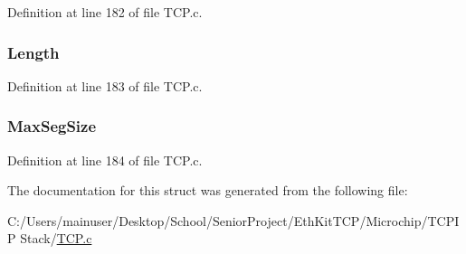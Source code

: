 Definition at line 182 of file T\+C\+P.\+c.

\hypertarget{struct_t_c_p___o_p_t_i_o_n_s_ae875c7698e130ba8324b8746c3ef7a11}{}
\subsubsection[{Length}]{ Length}\label{struct_t_c_p___o_p_t_i_o_n_s_ae875c7698e130ba8324b8746c3ef7a11}


Definition at line 183 of file T\+C\+P.\+c.

\hypertarget{struct_t_c_p___o_p_t_i_o_n_s_a4414eab3a6c9ce2fa592d8917a143515}{}
\subsubsection[{Max\+Seg\+Size}]{ Max\+Seg\+Size}\label{struct_t_c_p___o_p_t_i_o_n_s_a4414eab3a6c9ce2fa592d8917a143515}


Definition at line 184 of file T\+C\+P.\+c.



The documentation for this struct was generated from the following file\+:\begin{DoxyCompactItemize}
\item 
C\+:/\+Users/mainuser/\+Desktop/\+School/\+Senior\+Project/\+Eth\+Kit\+T\+C\+P/\+Microchip/\+T\+C\+P\+I\+P Stack/\hyperlink{_t_c_p_8c}{T\+C\+P.\+c}\end{DoxyCompactItemize}
